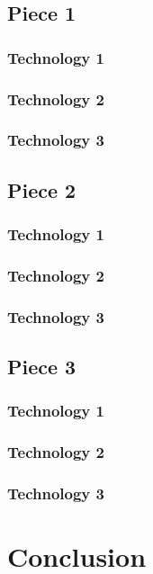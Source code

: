 \documentclass[letterpaper,10pt,titlepage,draftclsnofoot,onecolumn,onesided] {IEEEtran}
\begin{document}
\subsection{Piece 1}
\subsubsection{Technology 1}
\subsubsection{Technology 2}
\subsubsection{Technology 3}

\subsection{Piece 2}
\subsubsection{Technology 1}
\subsubsection{Technology 2}
\subsubsection{Technology 3}

\subsection{Piece 3}
\subsubsection{Technology 1}
\subsubsection{Technology 2}
\subsubsection{Technology 3}

\section{Conclusion}
\end{document}
